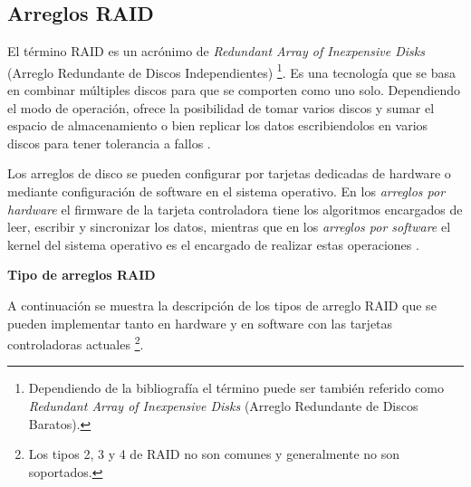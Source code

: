   \subsection {Arreglos RAID}
  \label{Arreglos-RAID}

El t\'{e}rmino \textsc{RAID} es un acr\'{o}nimo de \emph{Redundant Array of Inexpensive Disks} (Arreglo Redundante de Discos Independientes) \cite{_bytepile.com_????} \footnote{Dependiendo de la bibliograf\'{i}a el t\'{e}rmino puede ser tambi\'{e}n referido como \emph{Redundant Array of Inexpensive Disks} (Arreglo Redundante de Discos Baratos).}. Es una tecnolog\'{i}a que se basa en combinar m\'{u}ltiples discos para que se comporten como uno solo. Dependiendo el modo de operaci\'{o}n, ofrece la posibilidad de tomar varios discos y sumar el espacio de almacenamiento o bien replicar los datos escribiendolos en varios discos para tener tolerancia a fallos \cite{_raid_????-2}.

Los arreglos de disco se pueden configurar por tarjetas dedicadas de hardware o mediante configuraci\'{o}n de software en el sistema operativo. En los \emph{arreglos por hardware} el firmware de la tarjeta controladora tiene los algoritmos encargados de leer, escribir y sincronizar los datos, mientras que en los \emph{arreglos por software} el kernel del sistema operativo es el encargado de realizar estas operaciones \cite{_chapter_????}.

\textbf{Tipo de arreglos RAID}

A continuaci\'{o}n se muestra la descripci\'{o}n de los tipos de arreglo \textsc{RAID} que se pueden implementar tanto en hardware y en software con las tarjetas controladoras actuales \footnote{Los tipos 2, 3 y 4 de \textsc{RAID} no son comunes y generalmente no son soportados.}.

